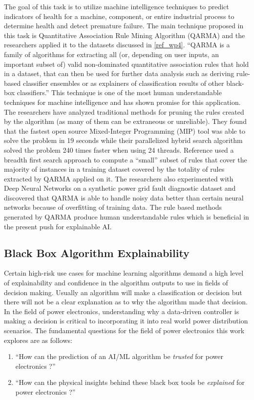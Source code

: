 The goal of this task is to utilize machine intelligence techniques to predict indicators of health for a machine, component, or entire industrial process to determine health and detect premature failure. The main technique proposed in this task is Quantitative Association Rule Mining Algorithm (QARMA) and the researchers applied it to the datasets discussed in \ref{ref_wp4}. \enquote{QARMA is a family of algorithms for extracting all (or, depending on user inputs, an important subset of) valid non-dominated quantitative association rules that hold in a dataset, that can then be used for further data analysis such as deriving rule-based classifier ensembles or as explainers of classification results of other black-box classifiers.}  This technique is one of the most human understandable techniques for machine intelligence and has shown promise for this application. The researchers have analyzed traditional methods for pruning the rules created by the algorithm (as many of them can be extraneous or unreliable). They found that the fastest open source Mixed-Integer Programming (MIP) tool was able to solve the problem in 19 seconds while their parallelized hybrid search algorithm solved the problem 240 times faster when using 24 threads. Reference \parencite{wp5.1} used a breadth first search approach to compute a ``small'' subset of rules that cover the majority of instances in a training dataset covered by the totality of rules extracted by QARMA applied on it. The researchers also experimented with Deep Neural Networks on a synthetic power grid fault diagnostic dataset and discovered that QARMA is able to handle noisy data better than certain neural networks because of overfitting of training data. The rule based methods generated by QARMA produce human understandable rules which is beneficial in the present push for explainable AI.

\subsection{Black Box Algorithm Explainability}

Certain high-risk use cases for machine learning algorithms demand a high level of explainability and confidence in the algorithm outputs to use in fields of decision making. Usually an algorithm will make a classification or decision but there will not be a clear explanation as to why the algorithm made that decision. In the field of power electronics, understanding why a data-driven controller is making a decision is critical to incorporating it into real world power distribution scenarios. The fundamental questions for the field of power electronics this work explores are as follows:
\begin{enumerate}
    \item \enquote{How can the prediction of an AI/ML algorithm be \textit{trusted} for power electronics \parencite{black-box-explainability}?}
    \item \enquote{How can the physical insights behind these black box tools be \textit{explained} for power electronics \parencite{black-box-explainability}?}
\end{enumerate}


